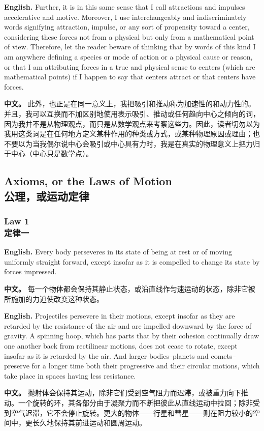 \noindent\textbf{English.} Further, it is in this same sense that I call attractions and impulses accelerative and motive. Moreover, I use interchangeably and indiscriminately words signifying attraction, impulse, or any sort of propensity toward a center, considering these forces not from a physical but only from a mathematical point of view. Therefore, let the reader beware of thinking that by words of this kind I am anywhere defining a species or mode of action or a physical cause or reason, or that I am attributing forces in a true and physical sense to centers (which are mathematical points) if I happen to say that centers attract or that centers have forces.
\par\noindent\textbf{中文。} 此外，也正是在同一意义上，我把吸引和推动称为加速性的和动力性的。并且，我可以互换而不加区别地使用表示吸引、推动或任何趋向中心之倾向的词，因为我并不是从物理观点，而只是从数学观点来考察这些力。因此，读者切勿以为我用这类词是在任何地方定义某种作用的种类或方式，或某种物理原因或理由；也不要以为当我偶尔说中心会吸引或中心具有力时，我是在真实的物理意义上把力归于中心（中心只是数学点）。
\medskip

\subsection*{Axioms, or the Laws of Motion\\公理，或运动定律}

\subsubsection*{Law 1\\定律一}
\noindent\textbf{English.} Every body perseveres in its state of being at rest or of moving uniformly straight forward, except insofar as it is compelled to change its state by forces impressed.
\par\noindent\textbf{中文。} 每一个物体都会保持其静止状态，或沿直线作匀速运动的状态，除非它被所施加的力迫使改变这种状态。
\medskip

\noindent\textbf{English.} Projectiles persevere in their motions, except insofar as they are retarded by the resistance of the air and are impelled downward by the force of gravity. A spinning hoop, which has parts that by their cohesion continually draw one another back from rectilinear motions, does not cease to rotate, except insofar as it is retarded by the air. And larger bodies--planets and comets--preserve for a longer time both their progressive and their circular motions, which take place in spaces having less resistance.
\par\noindent\textbf{中文。} 抛射体会保持其运动，除非它们受到空气阻力而迟滞，或被重力向下推动。一个旋转的环，其各部分由于凝聚力而不断把彼此从直线运动中拉回；除非受到空气迟滞，它不会停止旋转。更大的物体——行星和彗星——则在阻力较小的空间中，更长久地保持其前进运动和圆周运动。
\medskip

